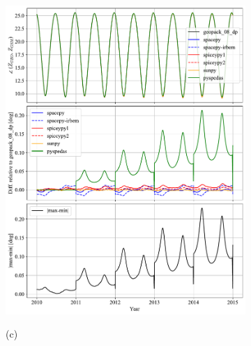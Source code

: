 \documentclass[draft]{agujournal2019}
\begin{document}
\begin{figure}[htb]
\begin{subfigure}[b]{0.49\textwidth}
         \includegraphics[width=\textwidth]{code/figures/angles/delta=1days_20100101-20150101/GEO_GSM.pdf}
     \end{subfigure}
     \par\bigskip\bigskip
     \begin{subfigure}[b]{0.49\textwidth}
         (c)
         \centering

\end{subfigure}
\end{figure}
\end{document}
